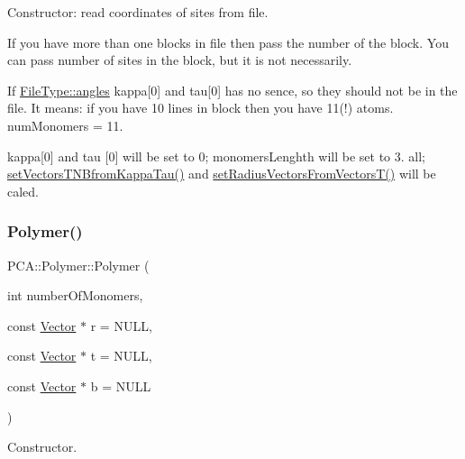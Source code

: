 Constructor\+: read coordinates of sites from file. 

If you have more than one blocks in file then pass the number of the block. You can pass number of sites in the block, but it is not necessarily.

If \hyperlink{class_p_c_a_1_1_polymer_a1df36a764fbf04ccd5cbe8edb49d43bda9bd139e0f52be4a748903ff60b5d3985}{File\+Type\+::angles} kappa\mbox{[}0\mbox{]} and tau\mbox{[}0\mbox{]} has no sence, so they should not be in the file. It means\+: if you have 10 lines in block then you have 11(!) atoms. num\+Monomers = 11.

kappa\mbox{[}0\mbox{]} and tau \mbox{[}0\mbox{]} will be set to 0; monomers\+Lenghth will be set to 3. all; \hyperlink{class_p_c_a_1_1_polymer_a55787461ed50776c48819a5cc3911c38}{set\+Vectors\+T\+N\+Bfrom\+Kappa\+Tau()} and \hyperlink{class_p_c_a_1_1_polymer_a258f607c38c1a247dd37659b236aa3fa}{set\+Radius\+Vectors\+From\+Vectors\+T()} will be caled. \hypertarget{class_p_c_a_1_1_polymer_ac2645c33eba98a8ec1670d69b92060c8}{}\label{class_p_c_a_1_1_polymer_ac2645c33eba98a8ec1670d69b92060c8} 
\subsubsection{\texorpdfstring{Polymer()}{Polymer()}\hspace{0.1cm}{\footnotesize\ttfamily [2/3]}}
{\footnotesize\ttfamily P\+C\+A\+::\+Polymer\+::\+Polymer (\begin{DoxyParamCaption}\item[{int}]{number\+Of\+Monomers,  }\item[{const \hyperlink{class_p_c_a_1_1_vector}{Vector} $\ast$}]{r = {\ttfamily NULL},  }\item[{const \hyperlink{class_p_c_a_1_1_vector}{Vector} $\ast$}]{t = {\ttfamily NULL},  }\item[{const \hyperlink{class_p_c_a_1_1_vector}{Vector} $\ast$}]{b = {\ttfamily NULL} }\end{DoxyParamCaption})}



Constructor. 

\hypertarget{class_p_c_a_1_1_polymer_a1ce99540db06e9e48392423ba516cd2f}{}\label{class_p_c_a_1_1_polymer_a1ce99540db06e9e48392423ba516cd2f} 

